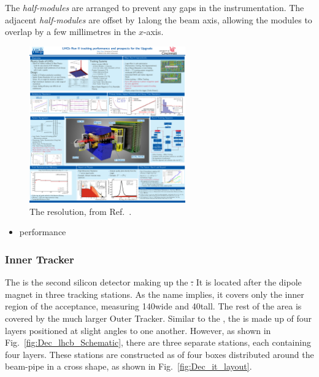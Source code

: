 The \emph{half-modules} are arranged to prevent any gaps in the instrumentation. The adjacent \emph{half-modules} are offset by 1\cm along the beam axis, allowing the modules to overlap by a few millimetres in the $x$-axis. 




\begin{figure}[!h]
    \centering
    \includegraphics[width=0.6\textwidth]{figs/Detector/tt_resolution.pdf}
    \caption{The \ttracker resolution, from Ref.~\cite{LHCb-DP-2014-002}.}
    \label{fig:Dec_velo_leakage_current}   
\end{figure}


{\color{Red}
\begin{itemize}
\item performance
\end{itemize}
}


\subsubsection{Inner Tracker}

The \intr is the second silicon detector making up the \st. It is located after the dipole magnet in three tracking stations. As the name implies, it covers only the inner region of the acceptance, measuring 140\cm wide and 40\cm tall. The rest of the area is covered by the much larger Outer Tracker. Similar to the \ttracker, the \intr is made up of four layers positioned at slight angles to one another. However, as shown in Fig.~\ref{fig:Dec_lhcb_Schematic}, there are three separate \intr stations, each containing four layers.
These stations are constructed as of four boxes distributed around the beam-pipe in a cross shape, as shown in Fig.~\ref{fig:Dec_it_layout}. 

